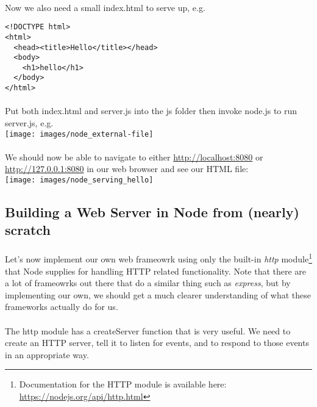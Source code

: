 \documentclass[10pt, a4paper, twosize]{article}
\begin{document}
\paragraph{} Now we also need a small index.html to serve up, e.g.

\begin{lstlisting}
<!DOCTYPE html>
<html>
  <head><title>Hello</title></head>
  <body>
    <h1>hello</h1>
  </body>
</html>
\end{lstlisting}

\paragraph{} Put both index.html and server.js into the js folder then invoke node.js to run server.js, e.g.\\

\texttt{[image: images/node\_external-file]}

\paragraph{} We should now be able to navigate to either \url{http://localhost:8080} or \url{http://127.0.0.1:8080} in our web browser and see our HTML file:\\

\texttt{[image: images/node\_serving\_hello]}

\subsection{Building a Web Server in Node from (nearly) scratch}
\paragraph{} Let's now implement our own web frameowrk using only the built-in \emph{http} module\footnote{Documentation for the HTTP module is available here: \url{https://nodejs.org/api/http.html}} that Node supplies for handling HTTP related functionality. Note that there are a lot of frameowrks out there that do a similar thing such as \emph{express}, but by implementing our own, we should get a much clearer understanding of what these frameworks actually do for us.

\paragraph{} The http module has a createServer function that is very useful. We need to create an HTTP server, tell it to listen for events, and to respond to those events in an appropriate way.
\end{document}
